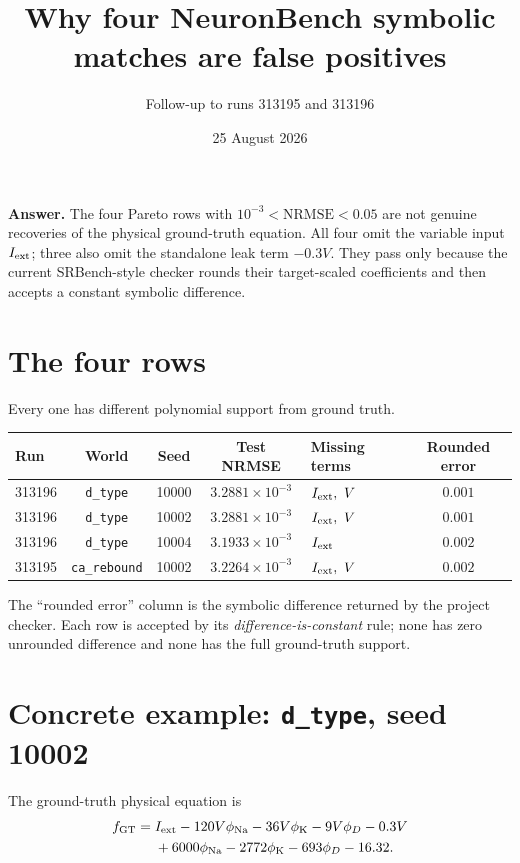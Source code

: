 \documentclass[11pt]{article}
\title{\vspace{-2em}\textcolor{accent}{\bfseries Why four NeuronBench symbolic matches are false positives}}
\author{Follow-up to runs 313195 and 313196}
\date{25 August 2026}
\newcommand{\nrmse}{\mathrm{NRMSE}}
\newcommand{\phina}{\phi_{\mathrm{Na}}}
\newcommand{\phik}{\phi_{\mathrm{K}}}
\begin{document}
\maketitle
\vspace{-1.4em}

\colorbox{soft}{\parbox{0.965\linewidth}{
\textbf{Answer.} The four Pareto rows with $10^{-3}<\nrmse<0.05$ are not
genuine recoveries of the physical ground-truth equation.  All four omit the
variable input $I_{\rm ext}$; three also omit the standalone leak term $-0.3V$.
They pass only because the current SRBench-style checker rounds their
target-scaled coefficients and then accepts a constant symbolic difference.
}}

\section*{The four rows}

Every one has different polynomial support from ground truth.

\begin{center}
\small
\begin{tabular}{lccclc}
\toprule
Run & World & Seed & Test NRMSE & Missing terms & Rounded error\\
\midrule
313196 & \texttt{d\_type} & 10000 & $3.2881\times10^{-3}$ & $I_{\rm ext},\ V$ & $0.001$\\
313196 & \texttt{d\_type} & 10002 & $3.2881\times10^{-3}$ & $I_{\rm ext},\ V$ & $0.001$\\
313196 & \texttt{d\_type} & 10004 & $3.1933\times10^{-3}$ & $I_{\rm ext}$ & $0.002$\\
313195 & \texttt{ca\_rebound} & 10002 & $3.2264\times10^{-3}$ & $I_{\rm ext},\ V$ & $0.002$\\
\bottomrule
\end{tabular}
\end{center}

The ``rounded error'' column is the symbolic difference returned by the project
checker.  Each row is accepted by its \emph{difference-is-constant} rule; none
has zero unrounded difference and none has the full ground-truth support.

\section*{Concrete example: \texttt{d\_type}, seed 10002}

The ground-truth physical equation is
\begin{align*}
f_{\rm GT}={}&I_{\rm ext}
-120V\phina-36V\phik-9V\phi_D-0.3V\\
&+6000\phina-2772\phik-693\phi_D-16.32.
\end{align*}
\end{document}
